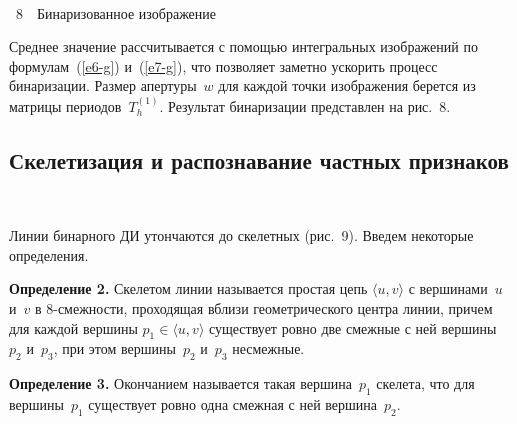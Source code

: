 \begin{multicols}{2}
\begin{center} %
\vspace*{9pt}
\mbox{%
 \epsfxsize=60mm
}
\end{center}
\begin{center}
\vspace*{1pt}
{{\figurename~8}\ \ \small{Бинаризованное изображение}}
\end{center}
\vspace*{11pt}

\addtocounter{figure}{1}


  Среднее значение рассчитывается с помощью интегральных изображений по 
формулам~(\ref{e6-g}) и~(\ref{e7-g}), что позволяет заметно ускорить процесс 
бинаризации. Размер апертуры~$w$ для каждой точки изображения берется из 
матрицы периодов~$T_h^{(1)}$. Результат бинаризации представлен на рис.~8.

\subsection{Скелетизация и распознавание частных признаков} %

\begin{figure*} %
 \vspace*{1pt}
 \begin{center}
 \mbox{%
 \epsfxsize=150mm
 }
 \end{center}
 \vspace*{-9pt}
\end{figure*}


  Линии бинарного ДИ утончаются до скелетных (рис.~9). Введем 
некоторые определения.
  
  
  \noindent
  \textbf{Определение 2.} Скелетом линии называется прос\-тая цепь $\langle 
u,v\rangle$ с вершинами~$u$ и~$v$ в 8-смеж\-ности, проходящая вблизи 
геометрического центра линии, причем для каждой вершины $p_1\in\langle 
u,v\rangle$ существует ровно две смежные с ней вершины~$p_2$ и~$p_3$, при 
этом вершины~$p_2$ и~$p_3$ несмежные.
  
  \smallskip
  
  \noindent
  \textbf{Определение 3.} Окончанием называется такая вершина~$p_1$ 
скелета, что для вершины~$p_1$ существует ровно одна смежная с ней 
вершина~$p_2$.
  

\end{multicols}
